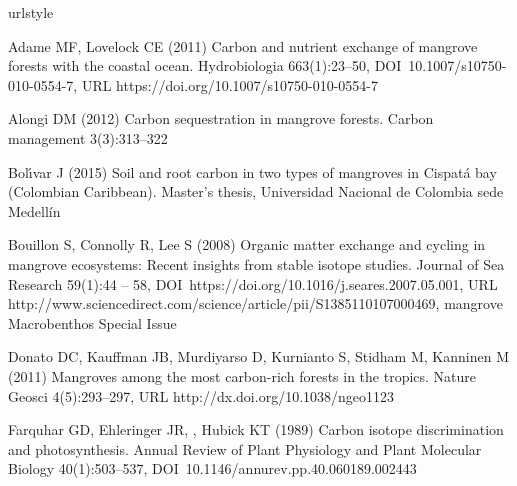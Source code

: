 %


\begin{thebibliography}{24}
\providecommand{\natexlab}[1]{#1}
\providecommand{\url}[1]{{#1}}
\providecommand{\urlprefix}{URL }
\expandafter\ifx\csname urlstyle\endcsname\relax
  \providecommand{\doi}[1]{DOI~\discretionary{}{}{}#1}\else
  \providecommand{\doi}{DOI~\discretionary{}{}{}\begingroup
  \urlstyle{rm}\Url}\fi
\providecommand{\eprint}[2][]{\url{#2}}

Adame MF, Lovelock CE (2011) Carbon and nutrient exchange of mangrove forests
  with the coastal ocean. Hydrobiologia 663(1):23--50,
  \doi{10.1007/s10750-010-0554-7},
  \urlprefix\url{https://doi.org/10.1007/s10750-010-0554-7}

Alongi DM (2012) Carbon sequestration in mangrove forests. Carbon management
  3(3):313--322

Bol{\'\i}var J (2015) {Soil and root carbon in two types of mangroves in
  Cispat\'a bay (Colombian Caribbean).} Master's thesis, Universidad Nacional
  de Colombia sede Medell\'in

Bouillon S, Connolly R, Lee S (2008) Organic matter exchange and cycling in
  mangrove ecosystems: Recent insights from stable isotope studies. Journal of
  Sea Research 59(1):44 -- 58,
  \doi{https://doi.org/10.1016/j.seares.2007.05.001},
  \urlprefix\url{http://www.sciencedirect.com/science/article/pii/S1385110107000469},
  mangrove Macrobenthos Special Issue

Donato DC, Kauffman JB, Murdiyarso D, Kurnianto S, Stidham M, Kanninen M (2011)
  Mangroves among the most carbon-rich forests in the tropics. Nature Geosci
  4(5):293--297, \urlprefix\url{http://dx.doi.org/10.1038/ngeo1123}

Farquhar GD, Ehleringer JR, , Hubick KT (1989) Carbon isotope discrimination
  and photosynthesis. Annual Review of Plant Physiology and Plant Molecular
  Biology 40(1):503--537, \doi{10.1146/annurev.pp.40.060189.002443}


\end{thebibliography}
